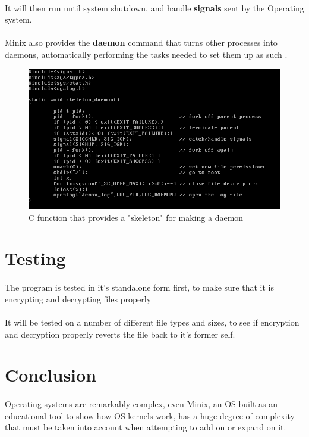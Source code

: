 \documentclass{article}
\begin{document}
        \paragraph{}It will then run until system shutdown, and handle \textbf{signals} sent by the Operating system.
        \paragraph{}Minix also provides the \textbf{daemon} command that turns other processes into daemons, automatically performing the tasks needed to set them up as such \parencite{daemon_command_minix}.

        \begin{figure}
            \centering
            \includegraphics{daemon_code_screenshot_1.png}
            \caption{C function that provides a "skeleton" for making a daemon}
            \label{fig:my_label}
        \end{figure}
    

\section{Testing}
    \paragraph{}The program is tested in it's standalone form first, to make sure that it is encrypting and decrypting files properly
    \paragraph{}It will be tested on a number of different file types and sizes, to see if encryption and decryption properly reverts the file back to it's former self.

\section{Conclusion}
    \paragraph{}Operating systems are remarkably complex, even Minix, an OS built as an educational tool to show how OS kernels work, has a huge degree of complexity that must be taken into account when attempting to add on or expand on it.

\printbibliography
\end{document}
